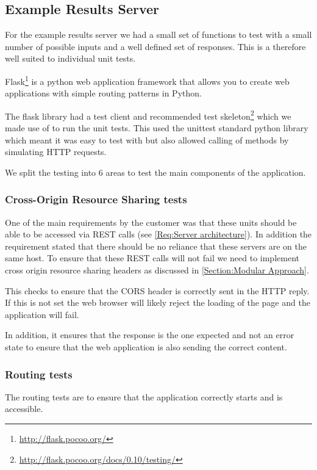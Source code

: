 \subsection{Example Results Server}
\label{Subsection:Example Results Server in example}

For the example results server we had a small set of functions to test with a small number of possible inputs and a well defined set of responses. This is a therefore well suited to individual unit tests.

Flask\footnote{\url{http://flask.pocoo.org/}} is a python web application framework that allows you to create web applications with simple routing patterns in Python.

The flask library had a test client and recommended test skeleton\footnote{\url{http://flask.pocoo.org/docs/0.10/testing/}} which we made use of to run the unit tests. This used the unittest standard python library which meant it was easy to test with but also allowed calling of methods by simulating HTTP requests.

We split the testing into 6 areas to test the main components of the application.

\subsubsection{Cross-Origin Resource Sharing tests}

One of the main requirements by the customer was that these units should be able to be accessed via REST calls (see \cref{Req:Server architecture}). In addition the requirement stated that there should be no reliance that these servers are on the same host. To ensure that these REST calls will not fail we need to implement cross origin resource sharing headers as discussed in \autoref{Section:Modular Approach}.

This checks to ensure that the CORS header is correctly sent in the HTTP reply. If this is not set the web browser will likely reject the loading of the page and the application will fail.

In addition, it ensures that the response is the one expected and not an error state to ensure that the web application is also sending the correct content.

\subsubsection{Routing tests}

The routing tests are to ensure that the application correctly starts and is accessible.

